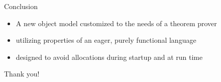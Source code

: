 \documentclass[t]{beamer}
\begin{document}
\begin{frame}{Conclusion}
  \begin{itemize}
  \item A new object model customized to the needs of a theorem prover
  \item utilizing properties of an eager, purely functional language
  \item designed to avoid allocations during startup and at run time
  \end{itemize}

  \pause
  \vfill

  \begin{center}
    \Huge{Thank you!}
  \end{center}
\end{frame}
\end{document}
